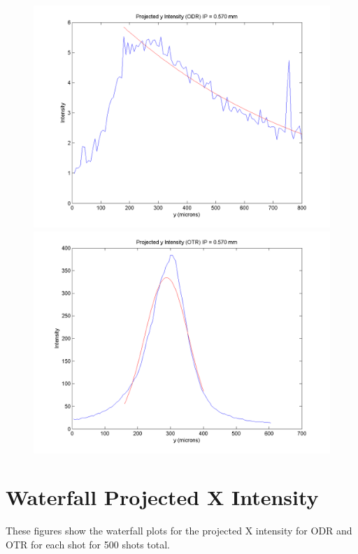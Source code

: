 \documentclass[12pt]{article}
\begin{document}
\begin{figure}
\begin{center}
\includegraphics[scale=0.5]{Figures/ProjY_ODR_570.PNG}
\includegraphics[scale=0.5]{Figures/ProjY_OTR_570.PNG}
\caption{}
\end{center}
\end{figure}



\newpage

\section{Waterfall Projected X Intensity}

These figures show the waterfall plots for the projected X intensity for ODR and OTR for each shot for 500 shots total.
\end{document}
